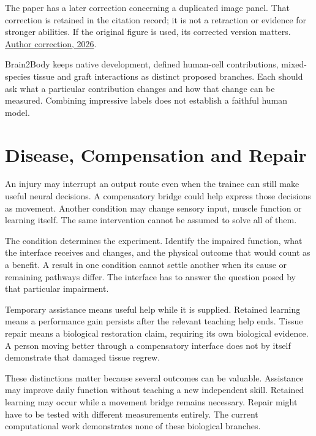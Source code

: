 The paper has a later correction concerning a duplicated image panel. That correction is retained in the citation record; it is not a retraction or evidence for stronger abilities. If the original figure is used, its corrected version matters. \href{https://www.nature.com/articles/s41586-026-10943-4}{Author correction, 2026}.\par

Brain2Body keeps native development, defined human-cell contributions, mixed-species tissue and graft interactions as distinct proposed branches. Each should ask what a particular contribution changes and how that change can be measured. Combining impressive labels does not establish a faithful human model.\par

\section{Disease, Compensation and Repair}

An injury may interrupt an output route even when the trainee can still make useful neural decisions. A compensatory bridge could help express those decisions as movement. Another condition may change sensory input, muscle function or learning itself. The same intervention cannot be assumed to solve all of them.\par

The condition determines the experiment. Identify the impaired function, what the interface receives and changes, and the physical outcome that would count as a benefit. A result in one condition cannot settle another when its cause or remaining pathways differ. The interface has to answer the question posed by that particular impairment.\par

Temporary assistance means useful help while it is supplied. Retained learning means a performance gain persists after the relevant teaching help ends. Tissue repair means a biological restoration claim, requiring its own biological evidence. A person moving better through a compensatory interface does not by itself demonstrate that damaged tissue regrew.\par

These distinctions matter because several outcomes can be valuable. Assistance may improve daily function without teaching a new independent skill. Retained learning may occur while a movement bridge remains necessary. Repair might have to be tested with different measurements entirely. The current computational work demonstrates none of these biological branches.\par

